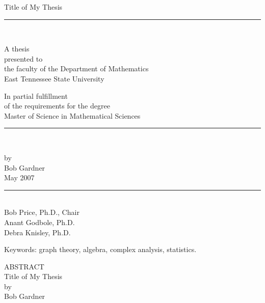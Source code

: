 \documentclass[12pt]{etsu_thesis}
\begin{document}
\thispagestyle{empty}


\begin{center}
{Title of My Thesis \\
[.04in]} \rm
\rule{1.25in}{.005in}\\[.0 in]

\vspace{.15in}

A thesis \\ [.04in]
presented to \\ [.04in]
the faculty of the Department of Mathematics \\[.04in]
East Tennessee State University \\ [.04in]

\vspace{.15in}

In partial fulfillment \\[.04in]of the requirements for the degree \\
[.04in] Master of Science in Mathematical Sciences \\ [.04in]
\rule{1.25in}{.005in}\\

\vspace{.15in}

by  \\ [.04in]
{ Bob Gardner } \\[.04in]
{May 2007} \\[.04in]
\rule{1.25in}{.005in}\\

\vspace{.15in}
Bob Price, Ph.D., Chair \\[.04in]
Anant Godbole, Ph.D. \\[.04in]
Debra Knisley, Ph.D. \\[.04in]

\vspace{.15in}

Keywords: graph theory, algebra, complex analysis, statistics.


\end{center}
\newpage
\pagestyle{plain}
\begin{center}
{ ABSTRACT}\\
{ Title of My Thesis \\ } by \\
[.1in]

{ Bob Gardner}\\[.1in]

\end{center}
\end{document}
